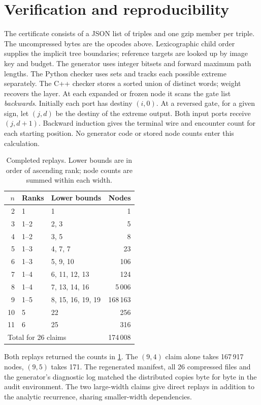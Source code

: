 \section{Verification and reproducibility}
The certificate consists of a JSON list of triples and one gzip member per
triple. The uncompressed bytes are the opcodes above. Lexicographic child
order supplies the implicit tree boundaries; reference targets are looked
up by image key and budget. The generator uses integer bitsets and forward
maximum path lengths. The Python checker uses sets and tracks each possible
extreme separately. The C++ checker stores a sorted union of distinct words;
weight recovers the layer. At each expanded or frozen node it scans the
gate list \emph{backwards}. Initially each port has destiny $(i,0)$. At a
reversed gate, for a given sign, let $(j,d)$ be the destiny of the extreme
output. Both input ports receive $(j,d+1)$. Backward induction gives the
terminal wire and encounter count for each starting position. No generator
code or stored node counts enter this calculation.

\begin{table}[ht]
\centering\small
\caption{Completed replays. Lower bounds are in order of ascending rank;
node counts are summed within each width.}
\label{tab:counts}
\begin{tabular}{rllr}\toprule
$n$&Ranks&Lower bounds&Nodes\\\midrule
2&1&1&1\\
3&1--2&2, 3&5\\
4&1--2&3, 5&8\\
5&1--3&4, 7, 7&23\\
6&1--3&5, 9, 10&106\\
7&1--4&6, 11, 12, 13&124\\
8&1--4&7, 13, 14, 16&5\,006\\
9&1--5&8, 15, 16, 19, 19&168\,163\\
10&5&22&256\\
11&6&25&316\\\midrule
\multicolumn{3}{l}{Total for 26 claims}&174\,008\\\bottomrule
\end{tabular}
\end{table}

Both replays returned the counts in \cref{tab:counts}. The $(9,4)$ claim
alone takes 167\,917 nodes, $(9,5)$ takes 171. The regenerated manifest,
all 26 compressed files and the generator's diagnostic log matched the
distributed copies byte for byte in the audit environment. The two
large-width claims give direct replays in addition to the analytic
recurrence, sharing smaller-width dependencies.

